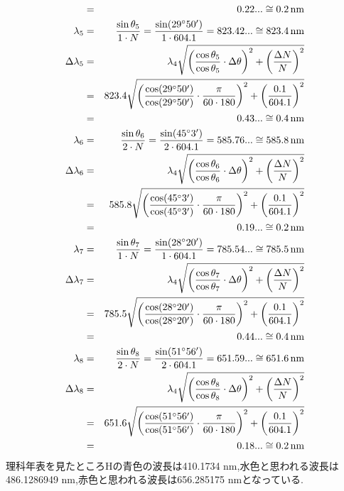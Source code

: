\documentclass[a4j,10pt]{jarticle}
\begin{document}
\begin{eqnarray*}
                        &=&0.22... \cong 0.2 \,{\rm nm} \\
      \lambda_5        &=& \frac{ \sin \theta_5 }{1 \cdot N} = \frac{\sin(29^\circ50')}{1\cdot604.1} = 823.42... \cong 823.4 \,{\rm nm} \\
      \Delta \lambda_5 &=& \lambda_4 \sqrt{ \left( \frac{\cos\theta_5}{\cos\theta_5} \cdot \Delta\theta \right)^2 + \left( \frac{\Delta N}{N} \right)^2 } \\
                       &=& 823.4 \sqrt{ \left( \frac{\cos(29^\circ50')}{\cos(29^\circ50')} \cdot \frac{\pi}{60\cdot180} \right)^2 + \left( \frac{0.1}{604.1} \right)^2 } \\
                       &=&0.43... \cong 0.4\, {\rm nm} \\
      \lambda_6        &=& \frac{ \sin \theta_6 }{2 \cdot N} = \frac{\sin(45^\circ3')}{2\cdot604.1} = 585.76... \cong 585.8 \,{\rm nm} \\
      \Delta \lambda_6 &=& \lambda_4 \sqrt{ \left( \frac{\cos\theta_6}{\cos\theta_6} \cdot \Delta\theta \right)^2 + \left( \frac{\Delta N}{N} \right)^2 } \\
                      &=& 585.8 \sqrt{ \left( \frac{\cos(45^\circ3')}{\cos(45^\circ3')} \cdot \frac{\pi}{60\cdot180} \right)^2 + \left( \frac{0.1}{604.1} \right)^2 } \\
                      &=&0.19... \cong 0.2\, {\rm nm} \\
      \lambda_7        &=& \frac{ \sin \theta_7 }{1 \cdot N} = \frac{\sin(28^\circ20')}{1\cdot604.1} = 785.54... \cong 785.5 \,{\rm nm} \\
      \Delta \lambda_7 &=& \lambda_4 \sqrt{ \left( \frac{\cos\theta_7}{\cos\theta_7} \cdot \Delta\theta \right)^2 + \left( \frac{\Delta N}{N} \right)^2 } \\
                      &=& 785.5 \sqrt{ \left( \frac{\cos(28^\circ20')}{\cos(28^\circ20')} \cdot \frac{\pi}{60\cdot180} \right)^2 + \left( \frac{0.1}{604.1} \right)^2 } \\
                      &=&0.44... \cong 0.4 \,{\rm nm} \\
      \lambda_8       &=& \frac{ \sin \theta_8 }{2 \cdot N} = \frac{\sin(51^\circ56')}{2\cdot604.1} = 651.59... \cong 651.6 \,{\rm nm} \\
      \Delta \lambda_8 &=& \lambda_4 \sqrt{ \left( \frac{\cos\theta_8}{\cos\theta_8} \cdot \Delta\theta \right)^2 + \left( \frac{\Delta N}{N} \right)^2 } \\
                      &=& 651.6 \sqrt{ \left( \frac{\cos(51^\circ56')}{\cos(51^\circ56')} \cdot \frac{\pi}{60\cdot180} \right)^2 + \left( \frac{0.1}{604.1} \right)^2 } \\
                      &=&0.18... \cong 0.2\, {\rm nm} \\
  \end{eqnarray*}
  理科年表\cite{b}を見たところHの青色の波長は410.1734 nm,水色と思われる波長は486.1286949 nm,赤色と思われる波長は656.285175 nmとなっている.
\end{document}
